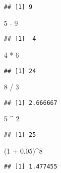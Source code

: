\documentclass[]{book}
\newenvironment{Shaded}{\begin{snugshade}}{\end{snugshade}}
\newcommand{\DecValTok}[1]{\textcolor[rgb]{0.00,0.00,0.81}{{#1}}}
\newcommand{\FloatTok}[1]{\textcolor[rgb]{0.00,0.00,0.81}{{#1}}}
\newcommand{\StringTok}[1]{\textcolor[rgb]{0.31,0.60,0.02}{{#1}}}
\newcommand{\NormalTok}[1]{{#1}}
\begin{document}
\begin{verbatim}
## [1] 9
\end{verbatim}

\begin{Shaded}
\begin{Highlighting}[]
\DecValTok{5} \NormalTok{-}\StringTok{ }\DecValTok{9}
\end{Highlighting}
\end{Shaded}

\begin{verbatim}
## [1] -4
\end{verbatim}

\begin{Shaded}
\begin{Highlighting}[]
\DecValTok{4} \NormalTok{*}\StringTok{ }\DecValTok{6}
\end{Highlighting}
\end{Shaded}

\begin{verbatim}
## [1] 24
\end{verbatim}

\begin{Shaded}
\begin{Highlighting}[]
\DecValTok{8} \NormalTok{/}\StringTok{ }\DecValTok{3}
\end{Highlighting}
\end{Shaded}

\begin{verbatim}
## [1] 2.666667
\end{verbatim}

\begin{Shaded}
\begin{Highlighting}[]
\DecValTok{5} \NormalTok{^}\StringTok{ }\DecValTok{2}
\end{Highlighting}
\end{Shaded}

\begin{verbatim}
## [1] 25
\end{verbatim}

\begin{Shaded}
\begin{Highlighting}[]
\NormalTok{(}\DecValTok{1} \NormalTok{+}\StringTok{ }\FloatTok{0.05}\NormalTok{)^}\DecValTok{8}
\end{Highlighting}
\end{Shaded}

\begin{verbatim}
## [1] 1.477455
\end{verbatim}
\end{document}
